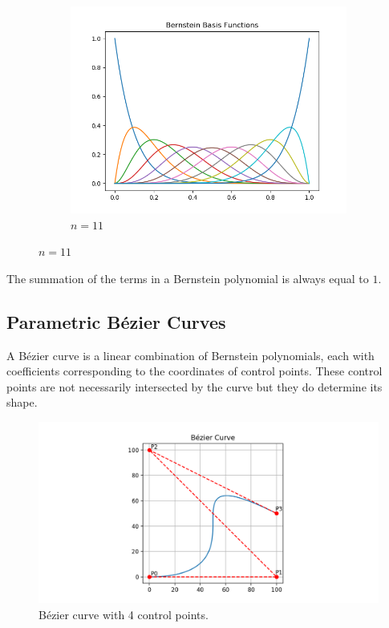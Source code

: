 \documentclass[12pt,letterpaper]{article}
\begin{document}
\begin{figure}[H]
\begin{center}
\begin{subfigure}[b]{.3\linewidth}
            \includegraphics[width=\linewidth]{bern11}
            \caption{$n=11$}
        \end{subfigure}
    \end{center}
\end{figure}

The summation of the terms in a Bernstein polynomial is always equal to $1$. 

\subsection{Parametric B\'ezier Curves}
A B\'ezier curve is a linear combination of Bernstein polynomials, each with coefficients corresponding to the coordinates of control points. These control points are not necessarily intersected by the curve but they do determine its shape.

\begin{figure}[H]
    \includegraphics[width=15cm]{Figure_1}
    \centering
    \caption{B\'ezier curve with 4 control points.}
    \label{fig:demo}
\end{figure}
\end{document}
